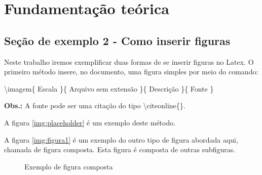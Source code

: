 \chapter{Fundamentação teórica} \label{ch:FundamentaçãoTeórica}






\section{Seção de exemplo 2 - Como inserir figuras}

Neste trabalho iremos exemplificar duas formas de se inserir figuras no Latex. O primeiro método insere, no documento, uma figura simples por meio do comando:

\textbackslash imagem\{ Escala \}\{ Arquivo sem extensão \}\{ Descrição \}\{ Fonte \}

\textbf{Obs.:} A fonte pode ser uma citação do tipo  \textbackslash citeonline\{\}.

A figura \ref{img:placeholder} é um exemplo deste método.


A figura \ref{img:figura1} é um exemplo do outro tipo de figura abordada aqui, chamada de figura composta. Esta figura é composta de outras subfiguras.
\begin{figure}[!htb]
\centering
    \caption{\label{img:figura1} Exemplo de figura composta}
    \qquad
    \vspace{1.5em}
\label{fig:dag}
\end{figure}

